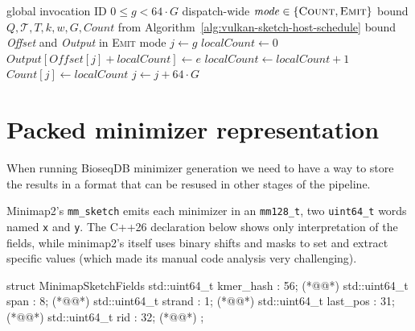 \begin{algorithm}[H]
\caption{\texttt{RecordOrderedSketchTile} call}
\label{alg:vulkan-ordered-invocation}
\footnotesize
\begin{algorithmic}[1]
    \Require global invocation ID $0\leq g<64\mathbin{\cdot}G$
    \Require dispatch-wide $\mathit{mode}\in\{\textsc{Count},\textsc{Emit}\}$
    \Require bound $Q,\mathcal T,T,k,w,G,\mathit{Count}$
    \Statex \hspace{\algorithmicindent}from
             Algorithm~\ref{alg:vulkan-sketch-host-schedule}
    \Require bound \emph{Offset} and \emph{Output} in \textsc{Emit} mode
    \State $j\gets g$
      \State $\mathit{localCount}\gets0$
          \State $\mathit{Output}[\mathit{Offset}[j]
                 +\mathit{localCount}]\gets e$
        \EndIf
        \State $\mathit{localCount}\gets\mathit{localCount}+1$
      \EndFor
        \State $\mathit{Count}[j]\gets\mathit{localCount}$
      \EndIf
      \State $j\gets j+64\mathbin{\cdot}G$
    \EndWhile
  \EndProcedure
\end{algorithmic}
\end{algorithm}


\section{Packed minimizer representation}
\label{sec:packed-minimizer-representation}

When running BioseqDB minimizer generation we need to have a way to store the results in a format that can be resused in other stages of the pipeline.

Minimap2's \texttt{mm\_sketch} emits each minimizer in an \texttt{mm128\_t},
two \texttt{uint64\_t} words named \texttt{x} and \texttt{y}.  The C++26
declaration below shows only interpretation of the fields, while minimap2's itself uses binary shifts and masks to set and extract specific values (which made its manual code analysis very challenging).

\begin{BioseqCppSnippet}[caption={Logical fields packed into a minimap2 minimizer.},label={lst:minimap-minimizer-cpp-decl}]
struct MinimapSketchFields {
  std::uint64_t kmer_hash : 56; (*@@*)
  std::uint64_t span      :  8; (*@@*)
  std::uint64_t strand    :  1; (*@@*)
  std::uint64_t last_pos  : 31; (*@@*)
  std::uint64_t rid       : 32; (*@@*)
};
\end{BioseqCppSnippet}

